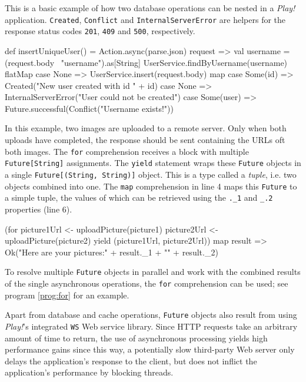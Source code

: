 \begin{program}
  \caption{This is a basic example of how two database operations can be nested in a \textit{Play!} application. \texttt{Created}, \texttt{Conflict} and \texttt{InternalServerError} are helpers for the response status codes \texttt{201}, \texttt{409} and \texttt{500}, respectively.}
  \label{prog:multimap}
  \begin{JavaCode}
def insertUniqueUser() = Action.async(parse.json) {
    request =>
        val username = (request.body \ "username").as[String]
        UserService.findByUsername(username) flatMap {
            case None =>
                UserService.insert(request.body) map {
                    case Some(id) =>
                        Created("New user created with id " + id)
                    case None =>
                        InternalServerError("User could not be created")
                }
             case Some(user) =>
                Future.successful(Conflict("Username exists!"))
        }
}
  \end{JavaCode}
\end{program}

\begin{program}
  \caption{In this example, two images are uploaded to a remote server. Only when both uploads have completed, the response should be sent containing the URLs oft both images. The \texttt{for} comprehension receives a block with multiple \texttt{Future[String]} assignments. The \texttt{yield} statement wraps these \texttt{Future} objects in a single \texttt{Future[(String, String)]} object. This is a type called a \textit{tuple}, i.e. two objects combined into one. The \texttt{map} comprehension in line 4 maps this \texttt{Future} to a simple tuple, the values of which can be retrieved using the \texttt{.\_1} and \texttt{\_.2} properties (line 6).}
  \label{prog:for}
\begin{JavaCode}
(for {
    picture1Url <- uploadPicture(picture1)
    picture2Url <- uploadPicture(picture2)
} yield (picture1Url, picture2Url)) map {
    result =>
        Ok("Here are your pictures:\n" + result._1 + "\n" + result._2)
}
\end{JavaCode}
\end{program}

To resolve multiple \texttt{Future} objects in parallel and work with the combined results of the single asynchronous operations, the \texttt{for} comprehension can be used; see program \ref{prog:for} for an example.

Apart from database and cache operations, \texttt{Future} objects also result from using \textit{Play!}'s integrated \texttt{WS} Web service library. Since HTTP requests take an arbitrary amount of time to return, the use of asynchronous processing yields high performance gains since this way, a potentially slow third-party Web server only delays the application's response to the client, but does not inflict the application's performance by blocking threads. 

